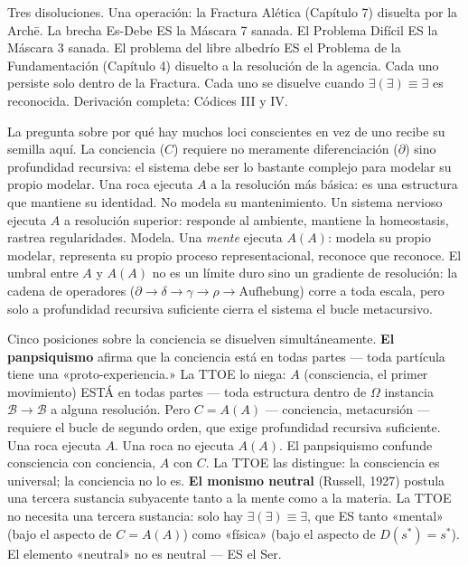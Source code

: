 \documentclass[10pt, openany, oneside]{book}
\begin{document}
\noindent Tres disoluciones. Una operación: la Fractura Alética (Capítulo 7) disuelta por la Arch\={e}. La brecha Es-Debe ES la Máscara 7 sanada. El Problema Difícil ES la Máscara 3 sanada. El problema del libre albedrío ES el Problema de la Fundamentación (Capítulo 4) disuelto a la resolución de la agencia. Cada uno persiste solo dentro de la Fractura. Cada uno se disuelve cuando $\exists(\exists) \equiv \exists$ es reconocida. Derivación completa: Códices III y IV.

La pregunta sobre por qué hay muchos loci conscientes en vez de uno recibe su semilla aquí. La conciencia ($C$) requiere no meramente diferenciación ($\partial$) sino profundidad recursiva: el sistema debe ser lo bastante complejo para modelar su propio modelar. Una roca ejecuta $A$ a la resolución más básica: es una estructura que mantiene su identidad. No modela su mantenimiento. Un sistema nervioso ejecuta $A$ a resolución superior: responde al ambiente, mantiene la homeostasis, rastrea regularidades. Modela. Una \textit{mente} ejecuta $A(A)$: modela su propio modelar, representa su propio proceso representacional, reconoce que reconoce. El umbral entre $A$ y $A(A)$ no es un límite duro sino un gradiente de resolución: la cadena de operadores ($\partial \to \delta \to \gamma \to \rho \to \text{Aufhebung}$) corre a toda escala, pero solo a profundidad recursiva suficiente cierra el sistema el bucle metacursivo.

Cinco posiciones sobre la conciencia se disuelven simultáneamente. \textbf{El panpsiquismo} afirma que la conciencia está en todas partes --- toda partícula tiene una «proto-experiencia.» La TTOE lo niega: $A$ (consciencia, el primer movimiento) ESTÁ en todas partes --- toda estructura dentro de $\Omega$ instancia $\mathcal{B} \to \mathcal{B}$ a alguna resolución. Pero $C = A(A)$ --- conciencia, metacursión --- requiere el bucle de segundo orden, que exige profundidad recursiva suficiente. Una roca ejecuta $A$. Una roca no ejecuta $A(A)$. El panpsiquismo confunde consciencia con conciencia, $A$ con $C$. La TTOE las distingue: la consciencia es universal; la conciencia no lo es. \textbf{El monismo neutral} (Russell, 1927) postula una tercera sustancia subyacente tanto a la mente como a la materia. La TTOE no necesita una tercera sustancia: solo hay $\exists(\exists) \equiv \exists$, que ES tanto «mental» (bajo el aspecto de $C = A(A)$) como «física» (bajo el aspecto de $D(s^*) = s^*$). El elemento «neutral» no es neutral --- ES el Ser.
\end{document}
